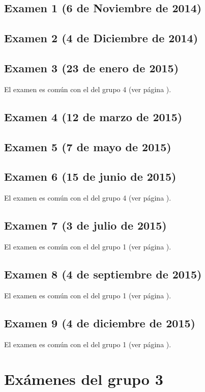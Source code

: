 \documentclass[a4paper,12pt,twoside]{book}
\begin{document}
\section{Examen 1 (6 de Noviembre de 2014)}
\section{Examen 2 (4 de Diciembre de 2014)}
\section{Examen 3 (23 de enero de 2015)}
El examen es común con el del grupo 4 (ver página \pageref{examen_14_15_4_3}).
\section{Examen 4 (12 de marzo de 2015)}
\section{Examen 5 (7 de mayo de 2015)}
\section{Examen 6 (15 de junio de 2015)}
El examen es común con el del grupo 4 (ver página \pageref{examen_14_15_4_6}).
\section{Examen 7 (3 de julio de 2015)}
El examen es común con el del grupo 1 (ver página \pageref{examen_14_15_1_7}).
\section{Examen 8 (4 de septiembre de 2015)}
El examen es común con el del grupo 1 (ver página \pageref{examen_14_15_1_8}).
\section{Examen 9 (4 de diciembre de 2015)}
El examen es común con el del grupo 1 (ver página \pageref{examen_14_15_1_9}).

\chapter{Exámenes del grupo 3}
\end{document}
